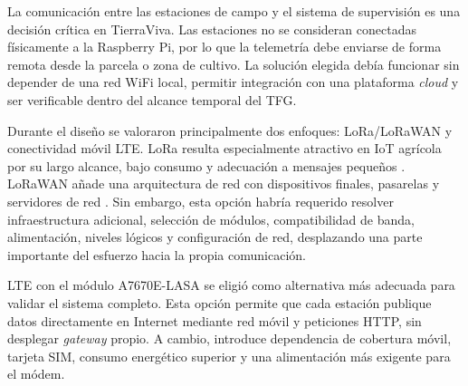 La comunicación entre las estaciones de campo y el sistema de supervisión es una decisión crítica en TierraViva. Las estaciones no se consideran conectadas físicamente a la Raspberry Pi, por lo que la telemetría debe enviarse de forma remota desde la parcela o zona de cultivo. La solución elegida debía funcionar sin depender de una red WiFi local, permitir integración con una plataforma \textit{cloud} y ser verificable dentro del alcance temporal del TFG.

Durante el diseño se valoraron principalmente dos enfoques: LoRa/LoRaWAN y conectividad móvil LTE. LoRa resulta especialmente atractivo en IoT agrícola por su largo alcance, bajo consumo y adecuación a mensajes pequeños \cite{semtech2015lora_modulation,augustin2016lora}. LoRaWAN añade una arquitectura de red con dispositivos finales, pasarelas y servidores de red \cite{lora_alliance_104}. Sin embargo, esta opción habría requerido resolver infraestructura adicional, selección de módulos, compatibilidad de banda, alimentación, niveles lógicos y configuración de red, desplazando una parte importante del esfuerzo hacia la propia comunicación.

LTE con el módulo A7670E-LASA se eligió como alternativa más adecuada para validar el sistema completo. Esta opción permite que cada estación publique datos directamente en Internet mediante red móvil y peticiones HTTP, sin desplegar \textit{gateway} propio. A cambio, introduce dependencia de cobertura móvil, tarjeta SIM, consumo energético superior y una alimentación más exigente para el módem.


